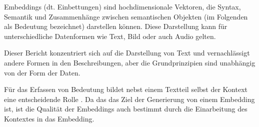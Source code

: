 \documentclass[../main.tex]{subfiles}
\begin{document}
Embeddings (dt. Einbettungen) sind hochdimensionale Vektoren, die Syntax, Semantik und Zusammenhänge zwischen semantischen Objekten (im Folgenden als Bedeutung bezeichnet) darstellen können.
Diese Darstellung kann für unterschiedliche Datenformen wie Text, Bild oder auch Audio gelten.
\cite{mikolov2013efficient}

Dieser Bericht konzentriert sich auf die Darstellung von Text und vernachlässigt andere Formen in den Beschreibungen, aber die Grundprinzipien sind unabhängig von der Form der Daten.

Für das Erfassen von Bedeutung bildet nebst einem Textteil selbst der Kontext eine entscheidende Rolle \cite{rubenstein1965contextual}.
Da das das Ziel der Generierung von einem Embedding ist, ist die Qualität der Embeddings auch bestimmt durch die Einarbeitung des Kontextes in das Embedding.
\cite{huang-etal-2012-improving}
\end{document}
